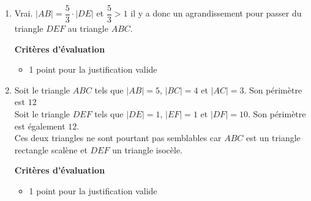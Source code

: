 %
%
    \begin{enumerate}
        \item Vrai. $|AB| = \dfrac{5}{3}\cdot|DE|$ et $\dfrac{5}{3} > 1$ il y a donc un agrandissement pour passer du triangle $DEF$ au triangle $ABC$.

              \textbf{Critères d'évaluation}
              \begin{itemize}
                  \item 1 point pour la justification valide
              \end{itemize}

        \item Soit le triangle $ABC$ tels que $|AB| = 5$, $|BC| = 4$ et $|AC|=3$. Son périmètre est $12$\\
              Soit le triangle $DEF$ tels que $|DE| = 1$, $|EF| = 1$ et $|DF| = 10$. Son périmètre est également $12$.\\
              Ces deux triangles ne sont pourtant pas semblables car $ABC$ est un triangle rectangle scalène et $DEF$ un triangle isocèle.

              \textbf{Critères d'évaluation}
              \begin{itemize}
                  \item 1 point pour la justification valide
              \end{itemize}
    \end{enumerate}
